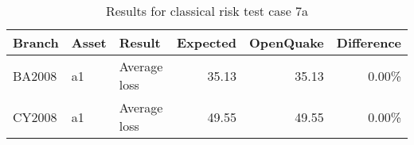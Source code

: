 \begin{table}[htbp]

\centering
\begin{tabular}{ l l l r r r }

\hline
\rowcolor{anti-flashwhite}
\bf{Branch} & \bf{Asset} & \bf{Result} & \bf{Expected} & \bf{OpenQuake} & \bf{Difference}\\
\hline
BA2008 & a1 & Average loss & 35.13 & 35.13 & 0.00\% \\
CY2008 & a1 & Average loss & 49.55 & 49.55 & 0.00\% \\
\hline
\end{tabular}

\caption{Results for classical risk test case 7a}
\label{tab:result-cr-7a}
\end{table}